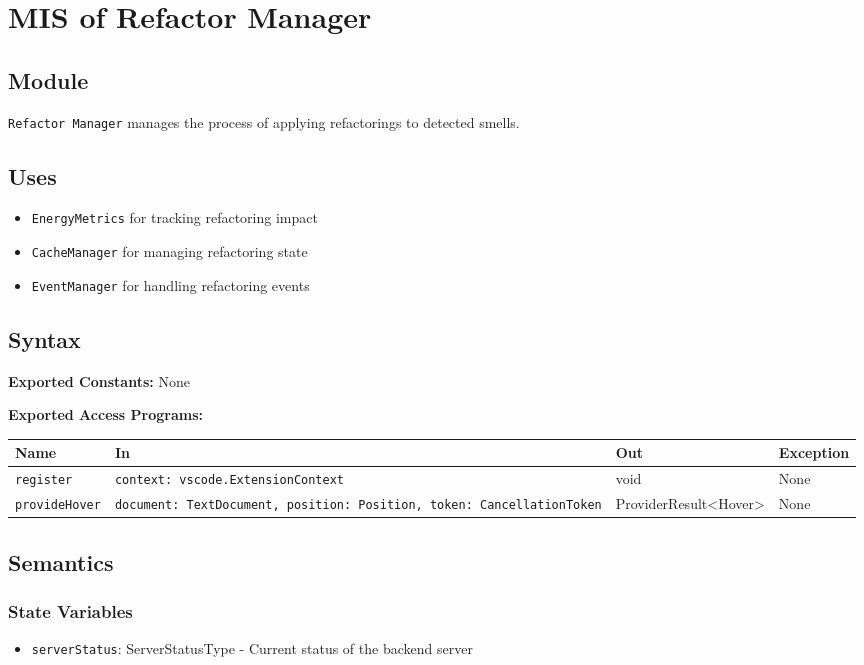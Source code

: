 \documentclass[12pt, titlepage]{article}
\begin{document}
\section{MIS of Refactor Manager}

\subsection{Module}
\texttt{Refactor Manager} manages the process of applying refactorings to detected smells.

\subsection{Uses}
\begin{itemize}
\item \texttt{EnergyMetrics} for tracking refactoring impact
\item \texttt{CacheManager} for managing refactoring state
\item \texttt{EventManager} for handling refactoring events
\end{itemize}

\subsection{Syntax}

\textbf{Exported Constants:} None

\textbf{Exported Access Programs:}\\

\begin{tabularx}{\linewidth}{|l|>{\raggedright\arraybackslash}X|l|l|}
  \hline
  \textbf{Name} & \textbf{In} & \textbf{Out} & \textbf{Exception} \\
  \hline
  \texttt{register} & \texttt{context: vscode.ExtensionContext} & void & None \\ \hline
  \texttt{provideHover} & \texttt{document: TextDocument, position: Position, token: CancellationToken} & ProviderResult<Hover> & None \\
  \hline
\end{tabularx}

\subsection{Semantics}

\subsubsection{State Variables}
\begin{itemize}
\item \texttt{serverStatus}: ServerStatusType - Current status of the backend server
\end{itemize}
\end{document}
